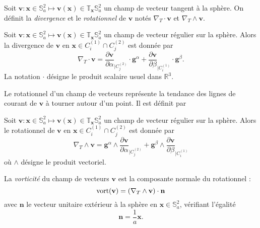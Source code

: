 Soit $\mathbf{v} : \mathbf{x} \in \mathbb{S}_a^2 \mapsto \mathbf{v}(\mathbf{x}) \in \mathbb{T}_{\mathbf{x}} \mathbb{S}_a^2$ un champ de vecteur tangent à la sphère. On définit la \textit{divergence} et le \textit{rotationnel} de $\mathbf{v}$ notés $\nabla_T \cdot \mathbf{v}$ et $\nabla_T \wedge \mathbf{v}$.

\begin{definition}
Soit $\mathbf{v} : \mathbf{x} \in \mathbb{S}_a^2 \mapsto \mathbf{v}(\mathbf{x}) \in \mathbb{T}_{\mathbf{x}} \mathbb{S}_a^2$ un champ de vecteur régulier sur la sphère. Alors la divergence de $\mathbf{v}$ en $\mathbf{x} \in C_i^{(1)} \cap C_j^{(2)}$ est donnée par
\begin{equation}
\nabla_T \cdot \mathbf{v} = \dfrac{\partial \mathbf{v}}{\partial \alpha}_{|C^{(2)}_j} \cdot \mathbf{g}^{\alpha} + \dfrac{\partial \mathbf{v}}{\partial \beta}_{|C^{(1)}_i} \cdot \mathbf{g}^{\beta}.
\end{equation}
\label{def:divergence}
La notation $\cdot$ désigne le produit scalaire usuel dans $\mathbb{R}^3$.
\end{definition}
Le rotationnel d'un champ de vecteurs représente la tendance des lignes de courant de $\mathbf{v}$ à tourner autour d'un point. Il est définit par

\begin{definition}
Soit $\mathbf{v} : \mathbf{x} \in \mathbb{S}_a^2 \mapsto \mathbf{v}(\mathbf{x}) \in \mathbb{T}_{\mathbf{x}} \mathbb{S}_a^2$ un champ de vecteur régulier sur la sphère. Alors le rotationnel de $\mathbf{v}$ en $\mathbf{x} \in C_i^{(1)} \cap C_j^{(2)}$ est donnée par
\begin{equation}
\nabla_T \wedge \mathbf{v} =  \mathbf{g}^{\alpha} \wedge \dfrac{\partial \mathbf{v}}{\partial \alpha}_{|C^{(2)}_j} + \mathbf{g}^{\beta} \wedge \dfrac{\partial \mathbf{v}}{\partial \beta}_{|C^{(1)}_i}
\end{equation}
où $\wedge$ désigne le produit vectoriel.
\label{def:rotationnel}
\end{definition}
La \textit{vorticité} du champ de vecteurs $\mathbf{v}$ est la composante normale du rotationnel :
\begin{equation}
\text{vort} ( \mathbf{v} ) = \left( \nabla_T \wedge \mathbf{v} \right) \cdot \mathbf{n}
\label{eq:vorticité}
\end{equation}
avec $\mathbf{n}$ le vecteur unitaire extérieur à la sphère en $\mathbf{x} \in \mathbb{S}_a^2$, vérifiant l'égalité
\begin{equation}
\mathbf{n} = \dfrac{1}{a} \mathbf{x}.
\end{equation}

